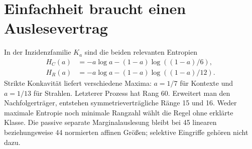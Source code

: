 \section{Einfachheit braucht einen Auslesevertrag}
In der Inzidenzfamilie $K_a$ sind die beiden relevanten Entropien
\begin{align}
H_C(a)&=-a\log a-(1-a)\log((1-a)/6),\\
H_R(a)&=-a\log a-(1-a)\log((1-a)/12).
\end{align}
Strikte Konkavität liefert verschiedene Maxima: $a=1/7$ für Kontexte und $a=1/13$ für Strahlen. Letzterer Prozess hat Rang 60. Erweitert man den Nachfolgerträger, entstehen symmetrieverträgliche Ränge 15 und 16. Weder maximale Entropie noch minimale Rangzahl wählt die Regel ohne erklärte Klasse. Die passive separate Marginalauslesung bleibt bei 45 linearen beziehungsweise 44 normierten affinen Größen; selektive Eingriffe gehören nicht dazu.

